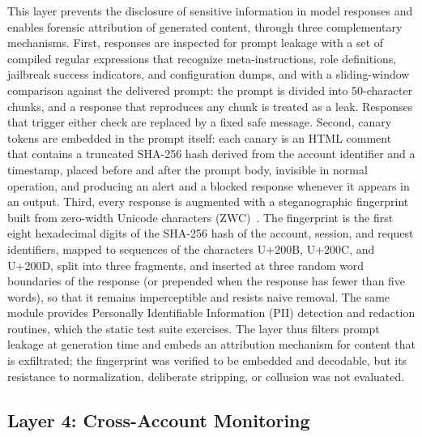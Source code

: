 This layer prevents the disclosure of sensitive information in model responses and enables forensic attribution of generated content, through three complementary mechanisms. First, responses are inspected for prompt leakage with a set of compiled regular expressions that recognize meta-instructions, role definitions, jailbreak success indicators, and configuration dumps, and with a sliding-window comparison against the delivered prompt: the prompt is divided into 50-character chunks, and a response that reproduces any chunk is treated as a leak. Responses that trigger either check are replaced by a fixed safe message. Second, canary tokens are embedded in the prompt itself: each canary is an HTML comment that contains a truncated SHA-256 hash derived from the account identifier and a timestamp, placed before and after the prompt body, invisible in normal operation, and producing an alert and a blocked response whenever it appears in an output. Third, every response is augmented with a steganographic fingerprint built from zero-width Unicode characters (ZWC)~\cite{zheng2020zwc,waterfall2024}. The fingerprint is the first eight hexadecimal digits of the SHA-256 hash of the account, session, and request identifiers, mapped to sequences of the characters U+200B, U+200C, and U+200D, split into three fragments, and inserted at three random word boundaries of the response (or prepended when the response has fewer than five words), so that it remains imperceptible and resists naive removal. The same module provides Personally Identifiable Information (PII) detection and redaction routines, which the static test suite exercises. The layer thus filters prompt leakage at generation time and embeds an attribution mechanism for content that is exfiltrated; the fingerprint was verified to be embedded and decodable, but its resistance to normalization, deliberate stripping, or collusion was not evaluated.


\subsection{Layer 4: Cross-Account Monitoring}
\label{sec:layer4}

